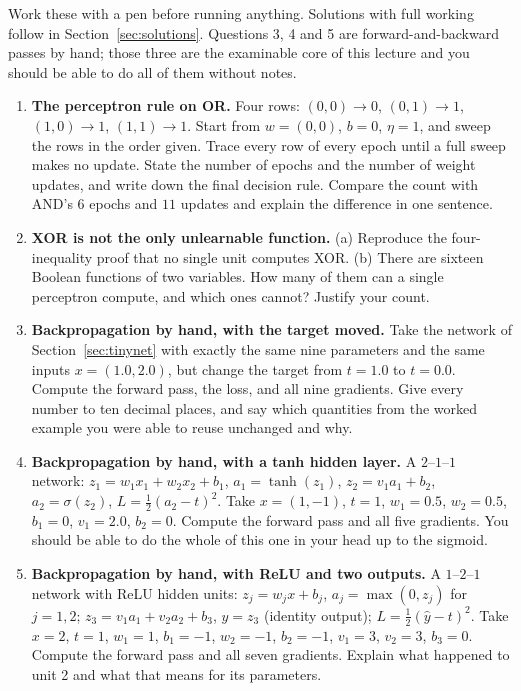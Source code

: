 \documentclass[11pt]{article}
\begin{document}
Work these with a pen before running anything. Solutions with full working
follow in Section~\ref{sec:solutions}. Questions 3, 4 and 5 are
forward-and-backward passes by hand; those three are the examinable core of
this lecture and you should be able to do all of them without notes.

\begin{enumerate}[leftmargin=*]
  \item \textbf{The perceptron rule on OR.} Four rows: $(0,0)\to 0$,
    $(0,1)\to 1$, $(1,0)\to 1$, $(1,1)\to 1$. Start from $w = (0,0)$, $b = 0$,
    $\eta = 1$, and sweep the rows in the order given. Trace every row of
    every epoch until a full sweep makes no update. State the number of epochs
    and the number of weight updates, and write down the final decision rule.
    Compare the count with AND's $6$ epochs and $11$ updates and explain the
    difference in one sentence.

  \item \textbf{XOR is not the only unlearnable function.} (a) Reproduce the
    four-inequality proof that no single unit computes XOR. (b) There are
    sixteen Boolean functions of two variables. How many of them can a single
    perceptron compute, and which ones cannot? Justify your count.

  \item \textbf{Backpropagation by hand, with the target moved.} Take the
    network of Section~\ref{sec:tinynet} with exactly the same nine parameters
    and the same inputs $x = (1.0, 2.0)$, but change the target from
    $t = 1.0$ to $t = \mathbf{0.0}$. Compute the forward pass, the loss, and
    all nine gradients. Give every number to ten decimal places, and say
    which quantities from the worked example you were able to reuse unchanged
    and why.

  \item \textbf{Backpropagation by hand, with a tanh hidden layer.} A
    $2$--$1$--$1$ network: $z_1 = w_1x_1 + w_2x_2 + b_1$, $a_1 = \tanh(z_1)$,
    $z_2 = v_1a_1 + b_2$, $a_2 = \sigma(z_2)$, $L = \tfrac12(a_2-t)^2$. Take
    $x = (1, -1)$, $t = 1$, $w_1 = 0.5$, $w_2 = 0.5$, $b_1 = 0$, $v_1 = 2.0$,
    $b_2 = 0$. Compute the forward pass and all five gradients. You should be
    able to do the whole of this one in your head up to the sigmoid.

  \item \textbf{Backpropagation by hand, with ReLU and two outputs.} A
    $1$--$2$--$1$ network with ReLU hidden units:
    $z_j = w_jx + b_j$, $a_j = \max(0, z_j)$ for $j = 1, 2$;
    $z_3 = v_1a_1 + v_2a_2 + b_3$, $\hat y = z_3$ (identity output);
    $L = \tfrac12(\hat y - t)^2$. Take $x = 2$, $t = 1$, $w_1 = 1$,
    $b_1 = -1$, $w_2 = -1$, $b_2 = -1$, $v_1 = 3$, $v_2 = 3$, $b_3 = 0$.
    Compute the forward pass and all seven gradients. Explain what happened to
    unit 2 and what that means for its parameters.


\end{enumerate}
\end{document}
